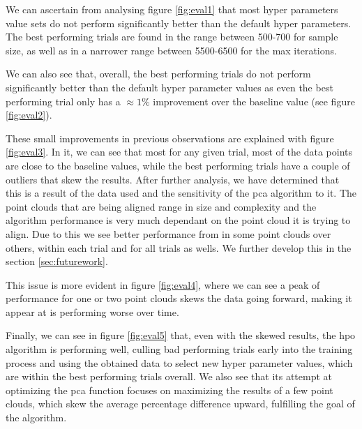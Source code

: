 We can ascertain from analysing figure \ref{fig:eval1} that most hyper parameters value sets do not perform significantly better than the default hyper parameters. The best performing trials are found in the range between 500-700 for sample size, as well as in a narrower range between 5500-6500 for the max iterations.

We can also see that, overall, the best performing trials do not perform significantly better than the default hyper parameter values as even the best performing trial only has a $\approx 1\%$ improvement over the baseline value (see figure \ref{fig:eval2}).

These small improvements in previous observations are explained with figure \ref{fig:eval3}. In it, we can see that most for any given trial, most of the data points are close to the baseline values, while the best performing trials have a couple of outliers that skew the results. After further analysis, we have determined that this is a result of the data used and the sensitivity of the \acrshort{pca} algorithm to it. The point clouds that are being aligned range in size and complexity and the algorithm performance is very much dependant on the point cloud it is trying to align. Due to this we see better performance from in some point clouds over others, within each trial and for all trials as wells. We further develop this in the section \ref{sec:futurework}.

This issue is more evident in figure \ref{fig:eval4}, where we can see a peak of performance for one or two point clouds skews the data going forward, making it appear at is performing worse over time.

Finally, we can see in figure \ref{fig:eval5} that, even with the skewed results, the \acrshort{hpo} algorithm is performing well, culling bad performing trials early into the training process and using the obtained data to select new hyper parameter values, which are within the best performing trials overall. We also see that its attempt at optimizing the \acrshort{pca} function focuses on maximizing the results of a few point clouds, which skew the average percentage difference upward, fulfilling the goal of the algorithm.